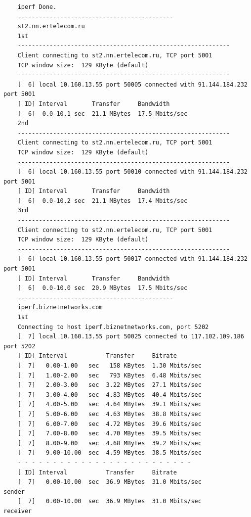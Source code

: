 \documentclass[paper=a4, fontsize=10pt]{scrartcl} %
\numberwithin{equation}{section} %
\numberwithin{figure}{section} %
\numberwithin{table}{section} %
\begin{document}
\begin{lstlisting}
    iperf Done.
    --------------------------------------------
    st2.nn.ertelecom.ru
    1st
    ------------------------------------------------------------
    Client connecting to st2.nn.ertelecom.ru, TCP port 5001
    TCP window size:  129 KByte (default)
    ------------------------------------------------------------
    [  6] local 10.160.13.55 port 50005 connected with 91.144.184.232 port 5001
    [ ID] Interval       Transfer     Bandwidth
    [  6]  0.0-10.1 sec  21.1 MBytes  17.5 Mbits/sec
    2nd
    ------------------------------------------------------------
    Client connecting to st2.nn.ertelecom.ru, TCP port 5001
    TCP window size:  129 KByte (default)
    ------------------------------------------------------------
    [  6] local 10.160.13.55 port 50010 connected with 91.144.184.232 port 5001
    [ ID] Interval       Transfer     Bandwidth
    [  6]  0.0-10.2 sec  21.1 MBytes  17.4 Mbits/sec
    3rd
    ------------------------------------------------------------
    Client connecting to st2.nn.ertelecom.ru, TCP port 5001
    TCP window size:  129 KByte (default)
    ------------------------------------------------------------
    [  6] local 10.160.13.55 port 50017 connected with 91.144.184.232 port 5001
    [ ID] Interval       Transfer     Bandwidth
    [  6]  0.0-10.0 sec  20.9 MBytes  17.5 Mbits/sec
    --------------------------------------------
    iperf.biznetnetworks.com
    1st
    Connecting to host iperf.biznetnetworks.com, port 5202
    [  7] local 10.160.13.55 port 50025 connected to 117.102.109.186 port 5202
    [ ID] Interval           Transfer     Bitrate
    [  7]   0.00-1.00   sec   158 KBytes  1.30 Mbits/sec                  
    [  7]   1.00-2.00   sec   793 KBytes  6.48 Mbits/sec                  
    [  7]   2.00-3.00   sec  3.22 MBytes  27.1 Mbits/sec                  
    [  7]   3.00-4.00   sec  4.83 MBytes  40.4 Mbits/sec                  
    [  7]   4.00-5.00   sec  4.64 MBytes  39.1 Mbits/sec                  
    [  7]   5.00-6.00   sec  4.63 MBytes  38.8 Mbits/sec                  
    [  7]   6.00-7.00   sec  4.72 MBytes  39.6 Mbits/sec                  
    [  7]   7.00-8.00   sec  4.70 MBytes  39.5 Mbits/sec                  
    [  7]   8.00-9.00   sec  4.68 MBytes  39.2 Mbits/sec                  
    [  7]   9.00-10.00  sec  4.59 MBytes  38.5 Mbits/sec                  
    - - - - - - - - - - - - - - - - - - - - - - - - -
    [ ID] Interval           Transfer     Bitrate
    [  7]   0.00-10.00  sec  36.9 MBytes  31.0 Mbits/sec                  sender
    [  7]   0.00-10.00  sec  36.9 MBytes  31.0 Mbits/sec                  receiver
    

\end{lstlisting}
\end{document}
